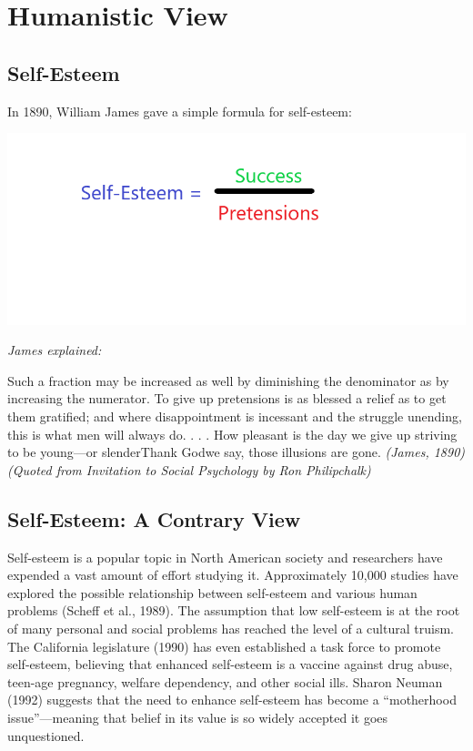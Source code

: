 \documentclass[
]{book}
\begin{document}
\hypertarget{humanistic-view}{%
\section{Humanistic View}\label{humanistic-view}}

\hypertarget{self-esteem}{%
\subsection*{Self-Esteem}\label{self-esteem}}

In 1890, William James gave a simple formula for self-esteem:

\includegraphics{assets/unit_5/Unit5_Topic2_Image.png}

\emph{James explained:}

Such a fraction may be increased as well by diminishing the denominator as by increasing the numerator. To give up pretensions is as blessed a relief as to get them gratified; and where disappointment is incessant and the struggle unending, this is what men will always do. . . . How pleasant is the day we give up striving to be young---or slenderThank Godwe say, those illusions are gone. \emph{(James, 1890) (Quoted from Invitation to Social Psychology by Ron Philipchalk)}

\hypertarget{self-esteem-a-contrary-view}{%
\subsection*{Self-Esteem: A Contrary View}\label{self-esteem-a-contrary-view}}

Self-esteem is a popular topic in North American society and researchers have expended a vast amount of effort studying it. Approximately 10,000 studies have explored the possible relationship between self-esteem and various human problems (Scheff et al., 1989). The assumption that low self-esteem is at the root of many personal and social problems has reached the level of a cultural truism. The California legislature (1990) has even established a task force to promote self-esteem, believing that enhanced self-esteem is a vaccine against drug abuse, teen-age pregnancy, welfare dependency, and other social ills. Sharon Neuman (1992) suggests that the need to enhance self-esteem has become a ``motherhood issue''---meaning that belief in its value is so widely accepted it goes unquestioned.
\end{document}
